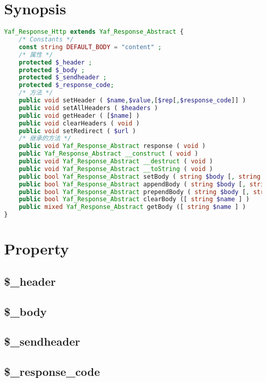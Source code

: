 \section{Synopsis}


\begin{lstlisting}[language=PHP]
Yaf_Response_Http extends Yaf_Response_Abstract {
    /* Constants */
    const string DEFAULT_BODY = "content" ;
    /* 属性 */
    protected $_header ;
    protected $_body ;
    protected $_sendheader ;
    protected $_response_code;
    /* 方法 */
    public void setHeader ( $name,$value,[$rep[,$response_code]] )
    public void setAllHeaders ( $headers )
    public void getHeader ( [$name] )
    public void clearHeaders ( void )
    public void setRedirect ( $url )
    /* 继承的方法 */
    public void Yaf_Response_Abstract response ( void )
    public Yaf_Response_Abstract __construct ( void )
    public void Yaf_Response_Abstract __destruct ( void )
    public void Yaf_Response_Abstract __toString ( void )
    public bool Yaf_Response_Abstract setBody ( string $body [, string $name ] )
    public bool Yaf_Response_Abstract appendBody ( string $body [, string $name ] )
    public bool Yaf_Response_Abstract prependBody ( string $body [, string $name ] )
    public bool Yaf_Response_Abstract clearBody ([ string $name ] )
    public mixed Yaf_Response_Abstract getBody ([ string $name ] )
}
\end{lstlisting}

\section{Property}

\subsection{\$\_header}


\subsection{\$\_body}


\subsection{\$\_sendheader}


\subsection{\$\_response\_code}

